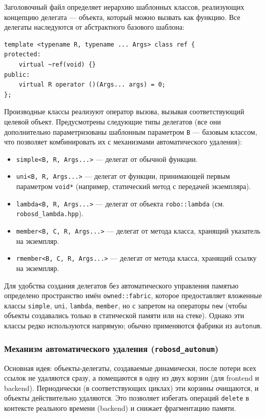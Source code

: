 \documentclass[a4paper,12pt]{article}
\begin{document}
Заголовочный файл определяет иерархию шаблонных классов, реализующих концепцию делегата — объекта, который можно вызвать как функцию. Все делегаты наследуются от абстрактного базового шаблона:

\begin{lstlisting}[caption={Базовый интерфейс делегата}]
template <typename R, typename ... Args> class ref {
protected:
    virtual ~ref(void) {}
public:
    virtual R operator ()(Args... args) = 0;
};
\end{lstlisting}

Производные классы реализуют оператор вызова, вызывая соответствующий целевой объект. Предусмотрены следующие типы делегатов (все они дополнительно параметризованы шаблонным параметром \texttt{B} — базовым классом, что позволяет комбинировать их с механизмами автоматического удаления):

\begin{itemize}
    \item \texttt{simple<B, R, Args...>} — делегат от обычной функции.
    \item \texttt{uni<B, R, Args...>} — делегат от функции, принимающей первым параметром \texttt{void*} (например, статический метод с передачей экземпляра).
    \item \texttt{lambda<B, R, Args...>} — делегат от объекта \texttt{robo::lambda} (см. \texttt{robosd\_lambda.hpp}).
    \item \texttt{member<B, C, R, Args...>} — делегат от метода класса, хранящий указатель на экземпляр.
    \item \texttt{rmember<B, C, R, Args...>} — делегат от метода класса, хранящий ссылку на экземпляр.
\end{itemize}

Для удобства создания делегатов без автоматического управления памятью определено пространство имён \texttt{owned::fabric}, которое предоставляет вложенные классы \texttt{simple}, \texttt{uni}, \texttt{lambda}, \texttt{member}, но с запретом на операторы \texttt{new} (чтобы объекты создавались только в статической памяти или на стеке). Однако эти классы редко используются напрямую; обычно применяются фабрики из \texttt{autonum}.

\subsubsection{Механизм автоматического удаления (\texttt{robosd\_autonum})}

Основная идея: объекты-делегаты, создаваемые динамически, после потери всех ссылок не удаляются сразу, а помещаются в одну из двух корзин (для frontend и backend). Периодически (в соответствующих циклах) эти корзины очищаются, и объекты действительно удаляются. Это позволяет избегать операций \texttt{delete} в контексте реального времени (backend) и снижает фрагментацию памяти.
\end{document}

